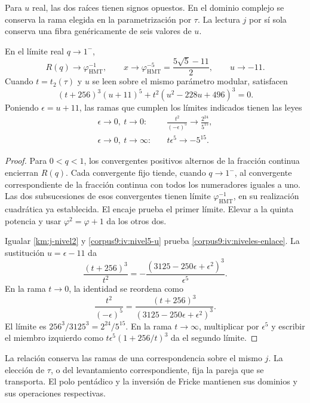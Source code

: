 Para \(u\) real, las dos raíces tienen signos opuestos. En el
dominio complejo se conserva la rama elegida en la parametrización
por \(\tau\). La lectura \(j\) por sí sola conserva una fibra
genéricamente de seis valores de \(u\).

\begin{proposition}
\label{corpus9:iv:niveles-ramas}
En el límite real \(q\to1^-\),
\[
 R(q)\longrightarrow\varphi_{\mathrm{HMT}}^{-1},\qquad
 x\longrightarrow\varphi_{\mathrm{HMT}}^{-5}
     =\frac{5\sqrt5-11}{2},\qquad u\longrightarrow-11.
\]
Cuando \(t=t_2(\tau)\) y \(u\) se leen sobre el mismo parámetro
modular, satisfacen
\begin{equation}
 (t+256)^3(u+11)^5
   +t^2(u^2-228u+496)^3=0.
 \label{corpus9:iv:niveles-enlace}
\end{equation}
Poniendo \(\epsilon=u+11\), las ramas que cumplen los límites
indicados tienen las leyes
\begin{align}
 \epsilon\to0,\ t\to0:
 &\quad \frac{t^2}{(-\epsilon)^5}\longrightarrow
          \frac{2^{24}}{5^{15}},\\
 \epsilon\to0,\ t\to\infty:
 &\quad t\epsilon^5\longrightarrow-5^{15}.
 \label{corpus9:iv:niveles-asintotica}
\end{align}
\end{proposition}
\begin{proof}
Para \(0<q<1\), los convergentes positivos alternos de la
fracción continua encierran \(R(q)\). Cada convergente fijo
tiende, cuando \(q\to1^-\), al convergente correspondiente de
la fracción continua con todos los numeradores iguales a uno.
Las dos subsucesiones de esos convergentes tienen límite
\(\varphi_{\mathrm{HMT}}^{-1}\), en su realización cuadrática
ya establecida. El encaje prueba el primer límite. Elevar a
la quinta potencia y usar \(\varphi^2=\varphi+1\) da los
otros dos.

Igualar \eqref{km:j-nivel2} y \eqref{corpus9:iv:nivel5-u}
prueba \eqref{corpus9:iv:niveles-enlace}. La sustitución
\(u=\epsilon-11\) da
\[
 \frac{(t+256)^3}{t^2}
   =-\frac{(3125-250\epsilon+\epsilon^2)^3}{\epsilon^5}.
\]
En la rama \(t\to0\), la identidad se reordena como
\[
 \frac{t^2}{(-\epsilon)^5}
   =\frac{(t+256)^3}{(3125-250\epsilon+\epsilon^2)^3}.
\]
El límite es \(256^3/3125^3=2^{24}/5^{15}\).
En la rama \(t\to\infty\), multiplicar por \(\epsilon^5\)
y escribir el miembro izquierdo como
\(t\epsilon^5(1+256/t)^3\) da el segundo límite.
\end{proof}

La relación conserva las ramas de una correspondencia sobre el
mismo \(j\). La elección de \(\tau\), o del levantamiento
correspondiente, fija la pareja que se transporta. El polo
pentádico y la inversión de Fricke mantienen sus dominios y sus
operaciones respectivas.
